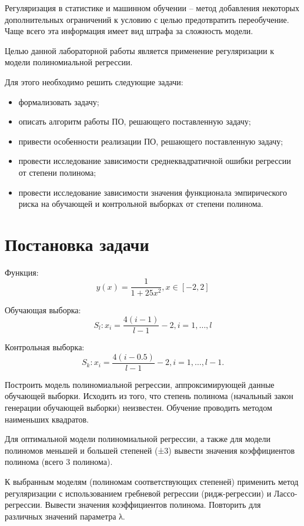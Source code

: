 \documentclass[12pt]{report}
\begin{document}
Регуляризация в статистике и машинном обучении -- метод добавления некоторых дополнительных ограничений к условию с целью предотвратить переобучение. Чаще всего эта информация имеет вид штрафа за сложность модели.

Целью данной лабораторной работы является применение регуляризации к модели полиномиальной регрессии.

Для этого необходимо решить следующие задачи:
\begin{itemize}
    \item формализовать задачу;
    \item описать алгоритм работы ПО, решающего поставленную задачу;
    \item привести особенности реализации ПО, решающего поставленную задачу;
    \item провести исследование зависимости среднеквадратичной ошибки регрессии от степени полинома;
    \item провести исследование зависимости значения функционала эмпирического риска на обучающей и контрольной выборках от степени полинома.
\end{itemize}

\section{Постановка задачи}

Функция:
\begin{equation}
    y(x) = \frac{1}{1 + 25x^2}, x \in [-2,2]
\end{equation}

Обучающая выборка:
\begin{equation}
S_l: x_i = \frac{4(i-1)}{l-1} - 2, i=1,\ldots,l 
\end{equation}

Контрольная выборка:
\begin{equation}
S_k: x_i = \frac{4(i-0.5)}{l-1} - 2, i=1,\ldots,l-1.
\end{equation}

Построить модель полиномиальной регрессии, аппроксимирующей данные обучающей выборки. Исходить из того, что степень полинома (начальный закон генерации обучающей выборки) неизвестен. 
Обучение проводить методом наименьших квадратов.

Для оптимальной модели полиномиальной регрессии, а также для модели полиномов меньшей и большей  степеней (±3) вывести значения коэффициентов полинома (всего 3 полинома). 

К выбранным моделям (полиномам соответствующих степеней) применить метод регуляризации с использованием гребневой регрессии (ридж-регрессии) и Лассо-регрессии. Вывести значения коэффициентов полинома. Повторить для различных значений параметра λ.
\end{document}
